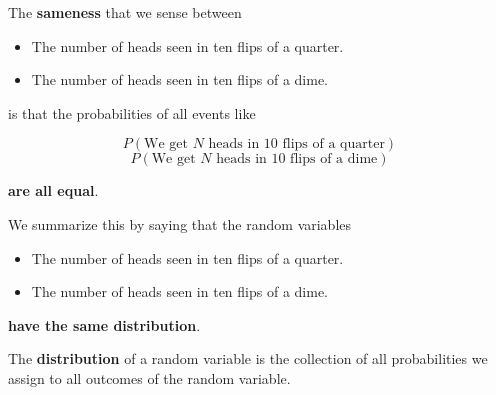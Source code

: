 %
\begin{frame}
The \textbf{sameness} that we sense between

\begin{itemize}
\item The number of heads seen in ten flips of a quarter.
\item The number of heads seen in ten flips of a dime.
\end{itemize}

is that the probabilities of all events like

$$ P(\text{We get } N \text{ heads in 10 flips of a quarter}) $$
$$ P(\text{We get } N \text{ heads in 10 flips of a dime}) $$

\textbf{are all equal}.
\end{frame}
%

%
\begin{frame}
We summarize this by saying that the random variables


\begin{itemize}
\item The number of heads seen in ten flips of a quarter.
\item The number of heads seen in ten flips of a dime.
\end{itemize}

\textbf{have the same distribution}.

The \textbf{distribution} of a random variable is the collection of all
probabilities we assign to all outcomes of the random variable.
\end{frame}
